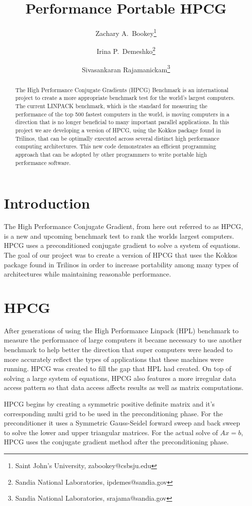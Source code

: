 \documentclass{ccr15}
\title{Performance Portable HPCG}
\author{Zachary A.\ Bookey\thanks{Saint John's University, zabookey@csbsju.edu} \and Irina P.\ Demeshko\thanks{Sandia National Laboratories,
ipdemes@sandia.gov} \and Sivasankaran Rajamanickam\thanks{Sandia National Laboratories, srajama@sandia.gov}}
\begin{document}
\maketitle

\begin{abstract}
The High Performance Conjugate Gradients (HPCG) Benchmark is an international project to create a
more appropriate benchmark test for the world's largest computers. The current LINPACK benchmark,
which is the standard for measuring the performance of the top 500 fastest computers in the
world, is moving computers in a direction that is no longer beneficial to many important
parallel applications. In this project we are developing a version of HPCG, using the Kokkos
package found in Trilinos, that can be optimally executed across several distinct high
performance computing architectures. This new code demonstrates an efficient programming 
approach that can be adopted by other programmers to write portable high performance software.
\end{abstract}

\section{Introduction}
The High Performance Conjugate Gradient, from here out referred to as HPCG, is a new and
upcoming benchmark test to rank the worlds largest computers. HPCG uses a preconditioned 
conjugate gradient to solve a system of equations. The goal of our project was to create a
version of HPCG that uses the Kokkos package found in Trilinos in order to increase portability
among many types of architectures while maintaining reasonable performance.

\section{HPCG}
After generations of using the High Performance Linpack (HPL) benchmark to measure the
performance of large computers it became necessary to use another benchmark to help better the 
direction that super computers were headed to more accurately reflect the types of applications
that these machines were running. HPCG was created to fill the gap that HPL had created. On top
of solving a large system of equations, HPCG also features a more irregular data access pattern
so that data access affects results as well as matrix computations.

HPCG begins by creating a symmetric positive definite matrix and it's corresponding multi grid 
to be used in the preconditioning phase. For the preconditioner it uses a Symmetric Gauss-Seidel 
forward sweep and back sweep to solve the lower and upper triangular matrices. For the actual
solve of $A x = b$, HPCG uses the conjugate gradient method after the preconditioning phase.
\end{document}
